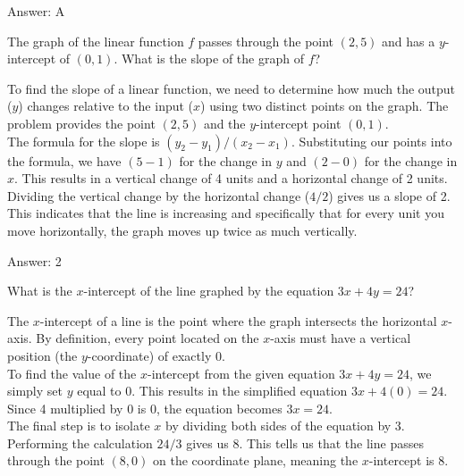 \documentclass[11pt,paper=a4,answers]{exam}
\begin{document}
\begin{questions}
\begin{solution}
\vspace{15pt}
Answer: \colorbox{yellow!100}{A}
\end{solution}

\question
The graph of the linear function $f$ passes through the point $(2, 5)$ and has a $y$-intercept of $(0, 1)$. What is the slope of the graph of $f$?

\begin{solution}
To find the slope of a linear function, we need to determine how much the output ($y$) changes relative to the input ($x$) using two distinct points on the graph. The problem provides the point $(2, 5)$ and the $y$-intercept point $(0, 1)$.
\\[10pt]
The formula for the slope is $(y_2 - y_1) / (x_2 - x_1)$. Substituting our points into the formula, we have $(5 - 1)$ for the change in $y$ and $(2 - 0)$ for the change in $x$. This results in a vertical change of 4 units and a horizontal change of 2 units.
\\[10pt]
Dividing the vertical change by the horizontal change ($4 / 2$) gives us a slope of 2. This indicates that the line is increasing and specifically that for every unit you move horizontally, the graph moves up twice as much vertically.

\vspace{15pt}
Answer: \colorbox{yellow!100}{2}
\end{solution}

\question
What is the $x$-intercept of the line graphed by the equation $3x + 4y = 24$?

\begin{solution}
The $x$-intercept of a line is the point where the graph intersects the horizontal $x$-axis. By definition, every point located on the $x$-axis must have a vertical position (the $y$-coordinate) of exactly 0. 
\\[10pt]
To find the value of the $x$-intercept from the given equation $3x + 4y = 24$, we simply set $y$ equal to 0. This results in the simplified equation $3x + 4(0) = 24$. Since 4 multiplied by 0 is 0, the equation becomes $3x = 24$.
\\[10pt]
The final step is to isolate $x$ by dividing both sides of the equation by 3. Performing the calculation $24 / 3$ gives us 8. This tells us that the line passes through the point $(8, 0)$ on the coordinate plane, meaning the $x$-intercept is 8.


\end{solution}
\end{questions}
\end{document}
